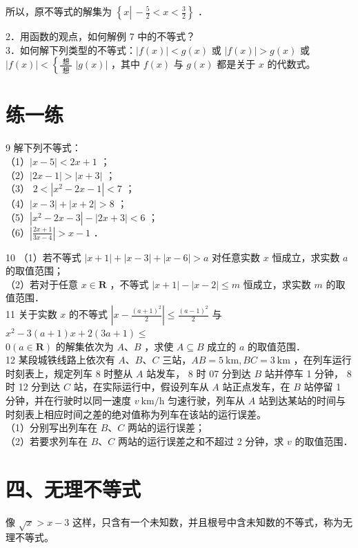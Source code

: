 \documentclass[10pt]{article}
\begin{document}
所以，原不等式的解集为 \(\left\{x \left\lvert\,-\frac{5}{2}<x<\frac{3}{2}\right.\right\}\) ．

2．用函数的观点，如何解例 7 中的不等式？\\
3．如何解下列类型的不等式：\(|f(x)|<g(x)\) 或 \(|f(x)|>g(x)\) 或 \(|f(x)|<\left\{\frac{\text { 想 }}{\text { 想 }}\right.\) \(|g(x)|\) ，其中 \(f(x)\) 与 \(g(x)\) 都是关于 \(x\) 的代数式。

\section*{练一练}
9 解下列不等式：\\
（1）\(|x-5|<2 x+1\) ；\\
（2）\(|2 x-1|>|x+3|\) ；\\
（3） \(2<\left|x^{2}-2 x-1\right|<7\) ；\\
（4）\(|x-3|+|x+2|>8\) ；\\
（5）\(\left|x^{2}-2 x-3\right|-|2 x+3|<6\) ；\\
（6）\(\left|\frac{2 x+1}{3 x-4}\right|>x-1\) ．

10 （1）若不等式 \(|x+1|+|x-3|+|x-6|>a\) 对任意实数 \(x\) 恒成立，求实数 \(a\) 的取值范围；\\
（2）若对于任意 \(x \in \mathbf{R}\) ，不等式 \(|x+1|-|x-2| \leqslant m\) 恒成立，求实数 \(m\) 的取值范围．\\
11 关于实数 \(x\) 的不等式 \(\left|x-\frac{(a+1)^{2}}{2}\right| \leqslant \frac{(a-1)^{2}}{2}\) 与 \(x^{2}-3(a+1) x+2(3 a+1) \leqslant\)\\
\(0(a \in \mathbf{R})\) 的解集依次为 \(A 、 B\) ，求使 \(A \subseteq B\) 成立的 \(a\) 的取值范围．\\
12 某段城铁线路上依次有 \(A 、 B 、 C\) 三站，\(A B=5 \mathrm{~km}, B C=3 \mathrm{~km}\) ，在列车运行时刻表上，规定列车 8 时整从 \(A\) 站发车， 8 时 07 分到达 \(B\) 站并停车 1 分钟， 8 时 12 分到达 \(C\) 站，在实际运行中，假设列车从 \(A\) 站正点发车，在 \(B\) 站停留 1 分钟，并在行驶时以同一速度 \(v \mathrm{~km} / \mathrm{h}\) 匀速行驶，列车从 \(A\) 站到达某站的时间与时刻表上相应时间之差的绝对值称为列车在该站的运行误差。\\
（1）分别写出列车在 \(B 、 C\) 两站的运行误差；\\
（2）若要求列车在 \(B 、 C\) 两站的运行误差之和不超过 2 分钟，求 \(v\) 的取值范围．

\section*{四、无理不等式}
像 \(\sqrt{x}>x-3\) 这样，只含有一个未知数，并且根号中含未知数的不等式，称为无理不等式。
\end{document}
